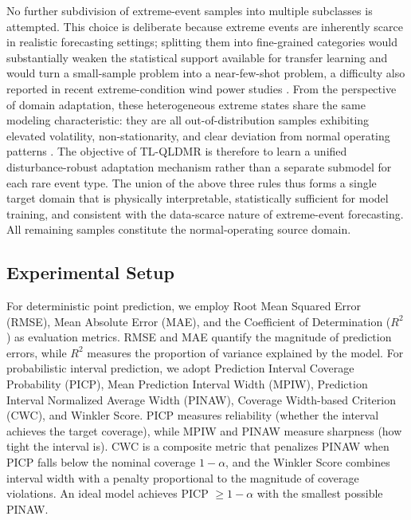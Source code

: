 No further subdivision of extreme-event samples into multiple subclasses is attempted. This choice is deliberate because extreme events are inherently scarce in realistic forecasting settings; splitting them into fine-grained categories would substantially weaken the statistical support available for transfer learning and would turn a small-sample problem into a near-few-shot problem, a difficulty also reported in recent extreme-condition wind power studies \citep{liang2025coldwave}. From the perspective of domain adaptation, these heterogeneous extreme states share the same modeling characteristic: they are all out-of-distribution samples exhibiting elevated volatility, non-stationarity, and clear deviation from normal operating patterns \citep{pan2010survey, bendavid2010theory}. The objective of TL-QLDMR is therefore to learn a unified disturbance-robust adaptation mechanism rather than a separate submodel for each rare event type. The union of the above three rules thus forms a single target domain that is physically interpretable, statistically sufficient for model training, and consistent with the data-scarce nature of extreme-event forecasting. All remaining samples constitute the normal-operating source domain.

\subsection{Experimental Setup}\label{sec:setup}

For deterministic point prediction, we employ Root Mean Squared Error (RMSE), Mean Absolute Error (MAE), and the Coefficient of Determination ($R^2$) as evaluation metrics. RMSE and MAE quantify the magnitude of prediction errors, while $R^2$ measures the proportion of variance explained by the model. For probabilistic interval prediction, we adopt Prediction Interval Coverage Probability (PICP), Mean Prediction Interval Width (MPIW), Prediction Interval Normalized Average Width (PINAW), Coverage Width-based Criterion (CWC), and Winkler Score. PICP measures reliability (whether the interval achieves the target coverage), while MPIW and PINAW measure sharpness (how tight the interval is). CWC is a composite metric that penalizes PINAW when PICP falls below the nominal coverage $1 - \alpha$, and the Winkler Score combines interval width with a penalty proportional to the magnitude of coverage violations. An ideal model achieves PICP $\ge 1 - \alpha$ with the smallest possible PINAW.

